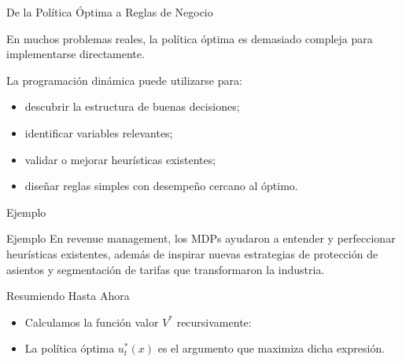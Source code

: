 \documentclass[xcolor=dvipsnames]{beamer}
\begin{document}
\begin{frame}{De la Política Óptima a Reglas de Negocio}

En muchos problemas reales, la política óptima es demasiado compleja para implementarse directamente.

\vspace{0.3cm}

La programación dinámica puede utilizarse para:

\begin{itemize}
\item descubrir la estructura de buenas decisiones;
\item identificar variables relevantes;
\item validar o mejorar heurísticas existentes;
\item diseñar reglas simples con desempeño cercano al óptimo.
\end{itemize}

\vspace{0.3cm}

\begin{block}{Ejemplo}
\begin{block}{Ejemplo}
En revenue management, los MDPs ayudaron a entender y perfeccionar heurísticas existentes, además de inspirar nuevas estrategias de protección de asientos y segmentación de tarifas que transformaron la industria.
\end{block}
\end{block}

\end{frame}


\begin{frame}{Resumiendo Hasta Ahora}
\begin{itemize}
\item Calculamos la funci\'on valor $V^*$ recursivamente:
\item<6-> La pol\'itica \'optima $u^*_t(x)$ es el argumento que maximiza dicha expresión.
\end{itemize}
\end{frame}
\end{document}
